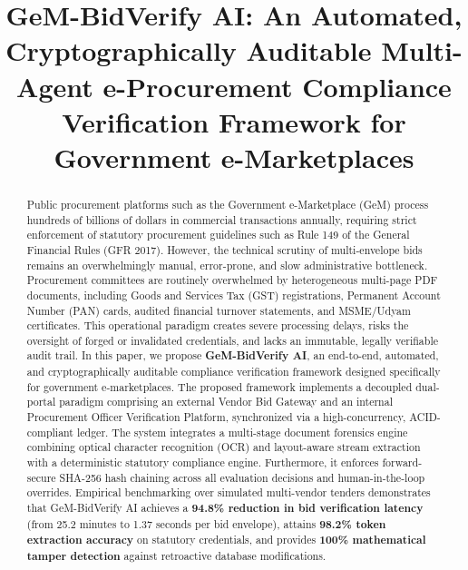 \documentclass[conference]{IEEEtran}
\begin{document}
\title{GeM-BidVerify AI: An Automated, Cryptographically Auditable Multi-Agent e-Procurement Compliance Verification Framework for Government e-Marketplaces\\
}

\author{
\and
{}
}

\maketitle

\begin{abstract}
Public procurement platforms such as the Government e-Marketplace (GeM) process hundreds of billions of dollars in commercial transactions annually, requiring strict enforcement of statutory procurement guidelines such as Rule 149 of the General Financial Rules (GFR 2017). However, the technical scrutiny of multi-envelope bids remains an overwhelmingly manual, error-prone, and slow administrative bottleneck. Procurement committees are routinely overwhelmed by heterogeneous multi-page PDF documents, including Goods and Services Tax (GST) registrations, Permanent Account Number (PAN) cards, audited financial turnover statements, and MSME/Udyam certificates. This operational paradigm creates severe processing delays, risks the oversight of forged or invalidated credentials, and lacks an immutable, legally verifiable audit trail. In this paper, we propose \textbf{GeM-BidVerify AI}, an end-to-end, automated, and cryptographically auditable compliance verification framework designed specifically for government e-marketplaces. The proposed framework implements a decoupled dual-portal paradigm comprising an external Vendor Bid Gateway and an internal Procurement Officer Verification Platform, synchronized via a high-concurrency, ACID-compliant ledger. The system integrates a multi-stage document forensics engine combining optical character recognition (OCR) and layout-aware stream extraction with a deterministic statutory compliance engine. Furthermore, it enforces forward-secure SHA-256 hash chaining across all evaluation decisions and human-in-the-loop overrides. Empirical benchmarking over simulated multi-vendor tenders demonstrates that GeM-BidVerify AI achieves a \textbf{94.8\% reduction in bid verification latency} (from 25.2 minutes to 1.37 seconds per bid envelope), attains \textbf{98.2\% token extraction accuracy} on statutory credentials, and provides \textbf{100\% mathematical tamper detection} against retroactive database modifications.
\end{abstract}
\end{document}
